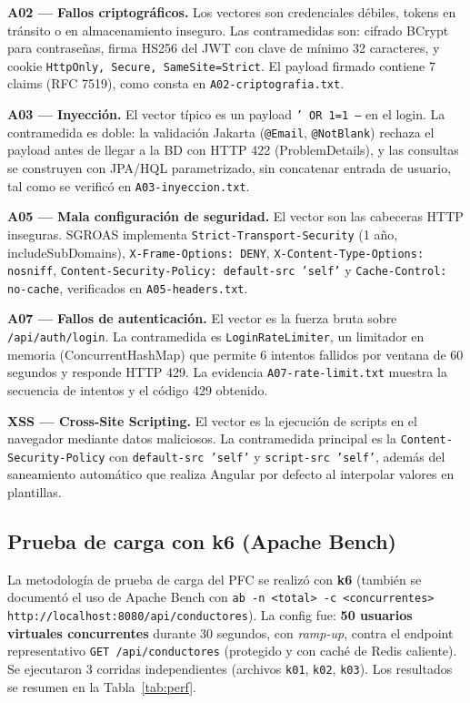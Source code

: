 \textbf{A02 — Fallos criptográficos.} Los vectores son credenciales débiles, tokens en tránsito o en almacenamiento
inseguro. Las contramedidas son: cifrado BCrypt para contraseñas, firma HS256 del JWT con clave de mínimo 32
caracteres, y cookie \texttt{HttpOnly, Secure, SameSite=Strict}. El payload firmado contiene 7 claims
(RFC 7519), como consta en \texttt{A02-criptografia.txt}.

\textbf{A03 — Inyección.} El vector típico es un payload \texttt{' OR 1=1 --} en el login. La contramedida es doble:
la validación Jakarta (\texttt{@Email}, \texttt{@NotBlank}) rechaza el payload antes de llegar a la BD con HTTP 422
(ProblemDetails), y las consultas se construyen con JPA/HQL parametrizado, sin concatenar entrada de usuario, tal
como se verificó en \texttt{A03-inyeccion.txt}.

\textbf{A05 — Mala configuración de seguridad.} El vector son las cabeceras HTTP inseguras. SGROAS implementa
\texttt{Strict-Transport-Security} (1 año, includeSubDomains), \texttt{X-Frame-Options: DENY},
\texttt{X-Content-Type-Options: nosniff}, \texttt{Content-Security-Policy: default-src 'self'} y
\texttt{Cache-Control: no-cache}, verificados en \texttt{A05-headers.txt}.

\textbf{A07 — Fallos de autenticación.} El vector es la fuerza bruta sobre \texttt{/api/auth/login}. La
contramedida es \texttt{LoginRateLimiter}, un limitador en memoria (ConcurrentHashMap) que permite 6 intentos
fallidos por ventana de 60 segundos y responde HTTP 429. La evidencia \texttt{A07-rate-limit.txt} muestra la
secuencia de intentos y el código 429 obtenido.

\textbf{XSS — Cross-Site Scripting.} El vector es la ejecución de scripts en el navegador mediante datos
maliciosos. La contramedida principal es la \texttt{Content-Security-Policy} con \texttt{default-src 'self'} y
\texttt{script-src 'self'}, además del saneamiento automático que realiza Angular por defecto al interpolar
valores en plantillas.

\subsection{Prueba de carga con k6 (Apache Bench)}

La metodología de prueba de carga del PFC se realizó con \textbf{k6} (también se documentó el uso de Apache Bench
con \texttt{ab -n <total> -c <concurrentes> http://localhost:8080/api/conductores}). La config fue: \textbf{50
usuarios virtuales concurrentes} durante 30 segundos, con \textit{ramp-up}, contra el endpoint representativo
\texttt{GET /api/conductores} (protegido y con caché de Redis caliente). Se ejecutaron 3 corridas independientes
(archivos \texttt{k01}, \texttt{k02}, \texttt{k03}). Los resultados se resumen en la Tabla~\ref{tab:perf}.

